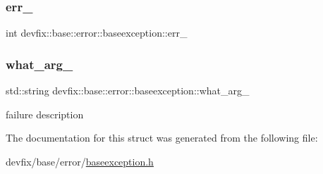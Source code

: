 \subsubsection{\texorpdfstring{err\+\_\+}{err\_}}
{\footnotesize\ttfamily int devfix\+::base\+::error\+::baseexception\+::err\+\_\+\hspace{0.3cm}{\ttfamily [protected]}}

\mbox{\label{structdevfix_1_1base_1_1error_1_1baseexception_adec18389f27e1d1dae67f80caa1b617b}} 
\subsubsection{\texorpdfstring{what\+\_\+arg\+\_\+}{what\_arg\_}}
{\footnotesize\ttfamily std\+::string devfix\+::base\+::error\+::baseexception\+::what\+\_\+arg\+\_\+\hspace{0.3cm}{\ttfamily [protected]}}



failure description 



The documentation for this struct was generated from the following file\+:\begin{DoxyCompactItemize}
\item 
devfix/base/error/\hyperlink{baseexception_8h}{baseexception.\+h}\end{DoxyCompactItemize}
